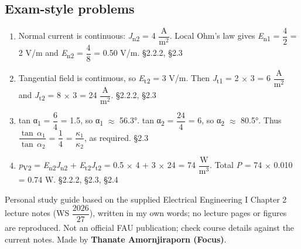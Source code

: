 \documentclass[11pt]{article}
\begin{document}
\begin{keepsection}\subsection{Exam-style problems}

\begin{enumerate}
\item Normal current is continuous: \textit{J}\textsubscript{n2} = 4 {\small\ensuremath{\dfrac{\mathrm{A}}{\mathrm{m}^{2}}}}. Local Ohm’s law gives \textit{E}\textsubscript{n1} = {\small\ensuremath{\dfrac{4}{2}}} = 2 V/m and \textit{E}\textsubscript{n2} = {\small\ensuremath{\dfrac{4}{8}}} = 0.50 V/m. \hfill{\small\color{FAUblue}§2.2.2, §2.3}
\item Tangential field is continuous, so \textit{E}\textsubscript{t2} = 3 V/m. Then \textit{J}\textsubscript{t1} = 2 \ensuremath{\times} 3 = 6 {\small\ensuremath{\dfrac{\mathrm{A}}{\mathrm{m}^{2}}}} and \textit{J}\textsubscript{t2} = 8 \ensuremath{\times} 3 = 24 {\small\ensuremath{\dfrac{\mathrm{A}}{\mathrm{m}^{2}}}}. \hfill{\small\color{FAUblue}§2.2.2, §2.3}
\item tan α\textsubscript{1} = {\small\ensuremath{\dfrac{6}{4}}} = 1.5, so α\textsubscript{1} \ensuremath{\approx} 56.3°. tan α\textsubscript{2} = {\small\ensuremath{\dfrac{24}{4}}} = 6, so α\textsubscript{2} \ensuremath{\approx} 80.5°. Thus {\small\ensuremath{\dfrac{\tan \, α_{1}}{\tan \, α_{2}}}} = {\small\ensuremath{\dfrac{1}{4}}} = {\small\ensuremath{\dfrac{κ_{1}}{κ_{2}}}}, as required. \hfill{\small\color{FAUblue}§2.3}
\item \textit{p}\textsubscript{V2} = \textit{E}\textsubscript{n2}\textit{J}\textsubscript{n2} + \textit{E}\textsubscript{t2}\textit{J}\textsubscript{t2} = 0.5 \ensuremath{\times} 4 + 3 \ensuremath{\times} 24 = 74 {\small\ensuremath{\dfrac{\mathrm{W}}{\mathrm{m}^{3}}}}. Total \textit{P} = 74 \ensuremath{\times} 0.010 = 0.74 W. \hfill{\small\color{FAUblue}§2.2.2, §2.3, §2.4}
\end{enumerate}

\end{keepsection}

\vfill{\small Personal study guide based on the supplied Electrical Engineering I Chapter 2 lecture notes (WS {\small\ensuremath{\dfrac{2026}{27}}}), written in my own words; no lecture pages or figures are reproduced. Not an official FAU publication; check course details against the current notes. Made by \textbf{Thanate Amornjiraporn (Focus)}.}
\end{document}
